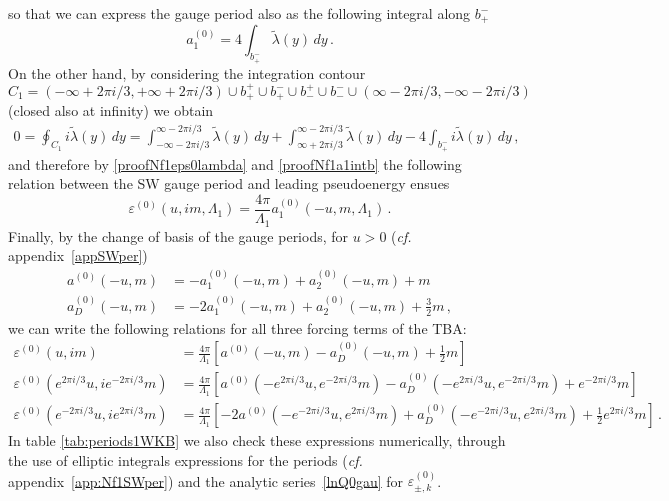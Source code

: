 \documentclass[11pt,a4paper]{elsarticle}
\def \ve {\varepsilon}
\def \ba {\begin{aligned}}
\def \ea {\end{aligned}}
\newcommand{\be}{\begin{equation}}
\newcommand{\ee}{\end{equation}}
\numberwithin{figure}{section}
\numberwithin{table}{section}
\begin{document}
so that we can express the gauge period also as the following integral along $b_+^-$
\begin{equation}\label{proofNf1a1intb}
a_1^{(0)}=  4     \int_{b_+^-} \tilde{\lambda}(y) \, d y\,.
\end{equation}
On the other hand, by considering the integration contour $C_1=(-\infty+2\pi i/3,+\infty+2\pi i/3)\cup b_+^+\cup b_+^-\cup b_-^+ \cup b_-^-\cup(\infty-2\pi i/3,-\infty-2\pi i/3)$ (closed also at infinity) we obtain
\begin{align}
   0=  \oint_{C_1} i \tilde\lambda(y) \, d y =\int_{-\infty-2 \pi i/3}^{\infty- 2 \pi i/3} \tilde\lambda(y) \, dy +\int_{\infty+2 \pi i/3}^{\infty- 2 \pi i/3} \tilde\lambda(y) \, dy -4 \int_{b_+^-} i \tilde\lambda(y) \, d y\, ,\end{align}
and therefore by \eqref{proofNf1eps0lambda} and \eqref{proofNf1a1intb} the following relation between the SW gauge period and leading pseudoenergy ensues
\begin{equation}
\varepsilon^{(0)}(u,i m,\Lambda_1)=\frac{4  \pi }{\Lambda_1}a_1^{(0)}(-u,m,\Lambda_1)\,.
\end{equation}
Finally, by the change of basis of the gauge periods, for $u>0$ (\textit{cf.} appendix~\ref{appSWper})
\be 
\ba 
a^{(0)}(-u,m) &= -a_1^{(0)}(-u,m) + a_2^{(0)}(-u,m) +  m  \\
a^{(0)}_D(-u,m) &= -2a_1^{(0)}(-u,m) + a_2^{(0)}(-u,m) + \frac{3}{2} m \,,
\ea 
\ee 
we can write the following relations for all three forcing terms of the TBA:
\small
\be\label{ep0-in-aaD-nZ3}
\ba
\ve^{(0)}(u, i m)  &= \frac{4\pi}{\Lambda_1}  \left[a^{(0)}(-u,m)- a^{(0)}_D(-u,m)+\frac{1}{2}m \right]\\
\ve^{(0)}(e^{2\pi i/3}u, i e^{-2\pi i/3} m) &=\frac{4\pi}{\Lambda_1}  \left[a^{(0)}( -e^{2 \pi i/3}u,e^{-2 \pi i/3}  m)-a^{(0)}_D( -e^{2 \pi i/3}u,e^{-2 \pi i/3}  m)+  e^{-2 \pi i/3}  m \right]\\
\ve^{(0)}(e^{-2\pi i/3}u, i e^{2\pi i/3}m)  &=\frac{4\pi}{\Lambda_1}\left[-2a^{(0)}(-e^{-2 \pi i/3}u,e^{2 \pi i/3} m)+a^{(0)}_D(-e^{-2 \pi i/3}u,e^{2 \pi i/3} m)+\frac{1}{2}  e^{2 \pi i/3} m \right]\,.
\ea
\ee
\normalsize
In table \ref{tab:periods1WKB} we also check these expressions numerically, through the use of elliptic integrals expressions for the periods (\textit{cf.} appendix~\ref{app:Nf1SWper}) and the analytic series~\eqref{lnQ0gau} for $\ve^{(0)}_{\pm,k}$.
\end{document}

